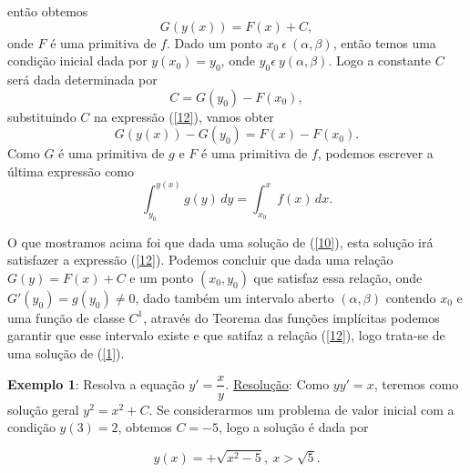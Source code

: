 \documentclass[blue]{beamer}
\numberwithin{equation}{section}
\begin{document}
\begin{frame}
	\justifying
então obtemos
\begin{equation} \label{12}
G(y(x)) = F(x) + C,
\end{equation}
onde $F$ é uma primitiva de $f$.
\hspace{0.2cm} Dado um ponto $x_0 \ \epsilon \ (\alpha, \beta)$, então temos uma condição inicial dada por $y(x_0) = y_0$, onde $y_0 \epsilon \ y(\alpha, \beta)$. Logo a constante $C$ será dada determinada por
$$C = G(y_0) - F(x_0),$$
substituindo $C$ na expressão (\ref{12}), vamos obter
$$G(y(x)) - G(y_0) = F(x) - F(x_0).$$
Como $G$ é uma primitiva de $g$ e $F$ é uma primitiva de $f$, podemos escrever a última expressão como
\begin{equation} \label{13}
\int_{y_0}^{y(x)} g(y) \, dy =  \int_{x_0}^{x} f(x) \, dx.
\end{equation}
	
\end{frame}

\begin{frame}
	\justifying
\hspace{0.2cm} O que mostramos acima foi que dada uma solução de (\ref{10}), esta solução irá satisfazer a expressão (\ref{12}). Podemos concluir que dada uma relação $G(y) = F(x) + C$ e um ponto $(x_0, y_0)$ que satisfaz essa relação, onde $G'(y_0) = g(y_0) \neq 0$, dado também um intervalo aberto $(\alpha, \beta)$ contendo $x_0$ e uma função de classe $C^{1}$, através do Teorema das funções implícitas podemos garantir que esse intervalo existe e que satifaz a relação (\ref{12}), logo trata-se de uma solução de (\ref{1}).

\begin{flushleft}
	\justifying
	\textbf{Exemplo 1}: Resolva a equação $y' = \dfrac{x}{y}.$ 
	\newline
	\underline{Resolução}: Como $yy' = x$, teremos como solução geral $y^{2} = x^{2} + C$. Se considerarmos um problema de valor inicial com a condição $y(3) = 2$, obtemos $C = - 5$, logo a solução é dada por \end{flushleft}
$$y(x) = +\sqrt{x^2 - 5}, \ x > \sqrt{5}.$$
	
\end{frame}
\end{document}
